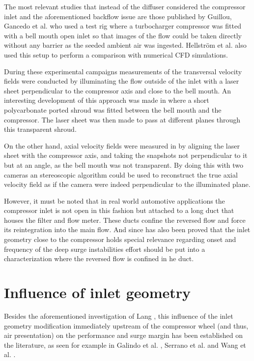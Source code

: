 The most relevant studies that instead of the diffuser considered the compressor inlet and the aforementioned backflow issue are those published by Guillou, Gancedo et al. \cite{guillou2010characterization,guillou2010surge,guillou2012piv,gancedo2016piv} who used a test rig where a turbocharger compressor was fitted with a bell mouth open inlet so that images of the flow could be taken directly without any barrier as the seeded ambient air was ingested. Hellström et al. \cite{hellstrom2010stall} also used this setup to perform a comparison with numerical CFD simulations.

During these experimental campaigns measurements of the transversal velocity fields were conducted by illuminating the flow outside of the inlet with a laser sheet perpendicular to the compressor axis and close to the bell mouth. An interesting development of this approach was made in \cite{gancedo2016piv} where a short polycarbonate ported shroud was fitted between the bell mouth and the compressor. The laser sheet was then made to pass at different planes through this transparent shroud.

On the other hand, axial velocity fields were measured in \cite{guillou2010characterization,guillou2012piv} by aligning the laser sheet with the compressor axis, and taking the snapshots not perpendicular to it but at an angle, as the bell mouth was not transparent. By doing this with two cameras an stereoscopic algorithm could be used to reconstruct the true axial velocity field as if the camera were indeed perpendicular to the illuminated plane.

However, it must be noted that in real world automotive applications the compressor inlet is not open in this fashion but attached to a long duct that houses the filter and flow meter. These ducts confine the reversed flow and force its reintegration into the main flow. And since has also been proved that the inlet geometry close to the compressor holds special relevance regarding onset and frequency of the deep surge instabilities \cite{galindo2013engine} effort should be put into a characterization where the reversed flow is confined in he duct.

\section{Influence of inlet geometry}
\label{sec:liter_influence}

Besides the aforementioned investigation of Lang \cite{lang2011contribucion}, this influence of the inlet geometry modification immediately upstream of the compressor wheel (and thus, air presentation) on the performance and surge margin has been established on the literature, as seen for example in Galindo et al. \cite{galindo2007potential}, Serrano et al. \cite{serrano2013optimization} and Wang et al. \cite{wang2013cha}.

